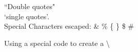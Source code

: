 \documentclass[10pt,a4paper]{article}
\begin{document}
``Double quotes"\\

`single quotes'.\\

Special Characters escaped: \& \% \{ \}  \$ \#

Using a special code to create a \textbackslash
\end{document}
